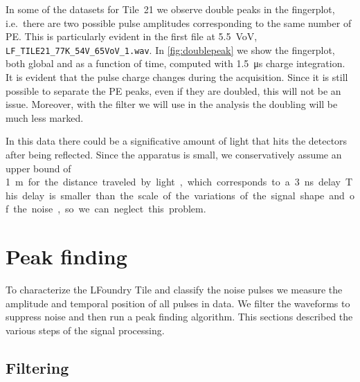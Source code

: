 In some of the datasets for Tile~21 we observe double peaks in the fingerplot,
i.e.~there are two possible pulse amplitudes corresponding to the same number
of PE. This is particularly evident in the first file at \SI{5.5}{VoV},
\nolinkurl{LF_TILE21_77K_54V_65VoV_1.wav}. In \autoref{fig:doublepeak} we show
the fingerplot, both global and as a function of time, computed with
\SI{1.5}{\micro s} charge integration. It is evident that the pulse charge
changes during the acquisition. Since it is still possible to separate the PE
peaks, even if they are doubled, this will not be an issue. Moreover, with the
filter we will use in the analysis the doubling will be much less marked.


\begin{figure}
    
    
    
\end{figure}

In this data there could be a significative amount of light that hits the
detectors after being reflected. Since the apparatus is small, we
conservatively assume an upper bound of \SI{1}m for the distance traveled by
light, which corresponds to a \SI{3}{ns} delay. This delay is smaller than the
scale of the variations of the signal shape and of the noise, so we can neglect
this problem.

\section{Peak finding}

To characterize the LFoundry Tile and classify the noise pulses we measure the
amplitude and temporal position of all pulses in data. We filter the waveforms
to suppress noise and then run a peak finding algorithm. This sections
described the various steps of the signal processing.

\subsection{Filtering}
\label{sec:filtering}


